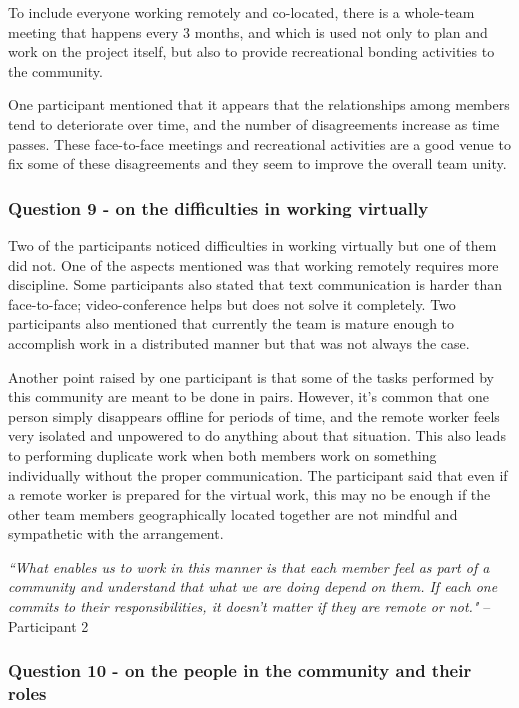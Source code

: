 \documentclass{sigchi}
\begin{document}
To include everyone working remotely and co-located, there is a whole-team meeting that happens every 3 months, and which is used not only to plan and work on the project itself, but also to provide recreational bonding activities to the community. 

One participant mentioned that it appears that the relationships among members tend to deteriorate over time, and the number of disagreements increase as time passes. These face-to-face meetings and recreational activities are a good venue to fix some of these disagreements and they seem to improve the overall team unity.

\subsubsection{Question 9 - on the difficulties in working virtually}

Two of the participants noticed difficulties in working virtually but one of them did not. One of the aspects mentioned was that working remotely requires more discipline. Some participants also stated that text communication is harder than face-to-face; video-conference helps but does not solve it completely. Two participants also mentioned that currently the team is mature enough to accomplish work in a distributed manner but that was not always the case. 

Another point raised by one participant is that some of the tasks performed by this community are meant to be done in pairs. However, it's common that one person simply disappears offline for periods of time, and the remote worker feels very isolated and unpowered to do anything about that situation. This also leads to performing duplicate work when both members work on something individually without the proper communication. The participant said that even if a remote worker is prepared for the virtual work, this may no be enough if the other team members geographically located together are not mindful and sympathetic with the arrangement.

\begin{displayquote}
\textit{``What enables us to work in this manner is that each member feel as part of a community and understand that what we are doing depend on them. If each one commits to their responsibilities, it doesn't matter if they are remote or not."} – Participant 2
\end{displayquote}

\subsubsection{Question 10 - on the people in the community and their roles}
\end{document}
